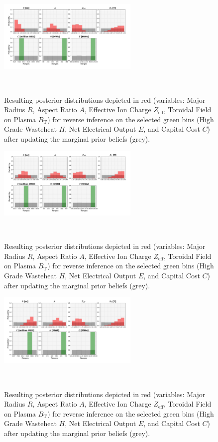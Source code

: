 \begin{figure}[ht]
    \centering
    \includegraphics[width=0.6\textwidth]{figures/TE_results/march_data/config(57)_3outputs_V2_6.png}
    \caption{Resulting posterior distributions depicted in red (variables: Major Radius $R$, Aspect Ratio $A$, Effective Ion Charge $Z_{\text{eff}}$, Toroidal Field on Plasma $B_{\text{T}}$) for reverse
    inference on the selected green bins (High Grade Wasteheat $H$, Net Electrical Output $E$, and  Capital Cost $C$) after updating the marginal prior beliefs (grey).}~\label{fig:config(57)_3outputs_V2_6}
\end{figure}

\begin{figure}[ht]
    \centering
    \includegraphics[width=0.6\textwidth]{figures/TE_results/march_data/config(57)_3outputs_V2_7.png}
    \caption{Resulting posterior distributions depicted in red (variables: Major Radius $R$, Aspect Ratio $A$, Effective Ion Charge $Z_{\text{eff}}$, Toroidal Field on Plasma $B_{\text{T}}$) for reverse
    inference on the selected green bins (High Grade Wasteheat $H$, Net Electrical Output $E$, and  Capital Cost $C$) after updating the marginal prior beliefs (grey).}~\label{fig:config(57)_3outputs_V2_7}
\end{figure}

\begin{figure}[ht]
    \centering
    \includegraphics[width=0.6\textwidth]{figures/TE_results/march_data/config(57)_3outputs_V2_8.png}
    \caption{Resulting posterior distributions depicted in red (variables: Major Radius $R$, Aspect Ratio $A$, Effective Ion Charge $Z_{\text{eff}}$, Toroidal Field on Plasma $B_{\text{T}}$) for reverse
    inference on the selected green bins (High Grade Wasteheat $H$, Net Electrical Output $E$, and  Capital Cost $C$) after updating the marginal prior beliefs (grey).}~\label{fig:config(57)_3outputs_V2_8}
\end{figure}

